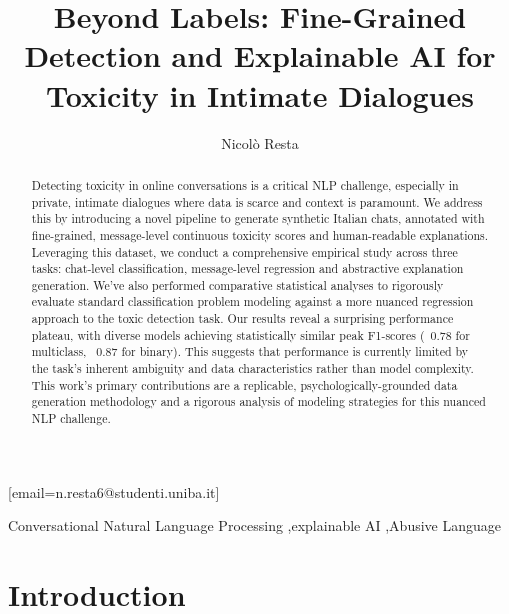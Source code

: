 \documentclass[twocolumn]{ceurart}
\begin{document}


\title{Beyond Labels: Fine-Grained Detection and Explainable AI for Toxicity in Intimate Dialogues}

\author[1]{Nicolò Resta}[email=n.resta6@studenti.uniba.it]
\address[1]{University of Bari, Aldo Moro}

\begin{abstract}
Detecting toxicity in online conversations is a critical NLP challenge, especially in private, intimate dialogues where data is scarce and context is paramount. We address this by introducing a novel pipeline to generate synthetic Italian chats, annotated with fine-grained, message-level continuous toxicity scores and human-readable explanations. Leveraging this dataset, we conduct a comprehensive empirical study across three tasks: chat-level classification, message-level regression and abstractive explanation generation. We've also performed comparative statistical analyses to rigorously evaluate standard classification problem modeling against a more nuanced regression approach to the toxic detection task. Our results reveal a surprising performance plateau, with diverse models achieving statistically similar peak F1-scores (~0.78 for multiclass, ~0.87 for binary). This suggests that performance is currently limited by the task's inherent ambiguity and data characteristics rather than model complexity. This work's primary contributions are a replicable, psychologically-grounded data generation methodology and a rigorous analysis of modeling strategies for this nuanced NLP challenge.
\end{abstract}

\begin{keywords}
Conversational Natural Language Processing \sep explainable AI \sep Abusive Language %
\end{keywords}

\maketitle

\section{Introduction}
\end{document}
